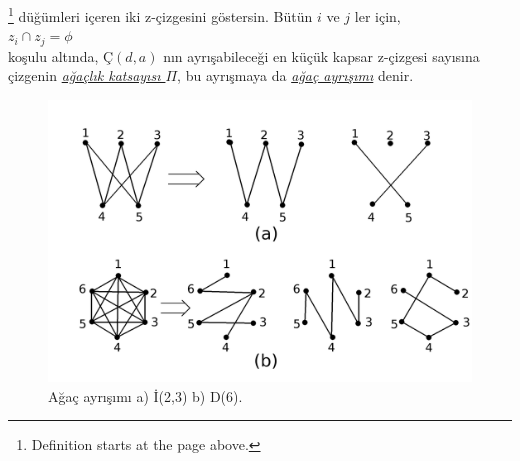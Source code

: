 \documentclass[11pt]{amsbook}
\begin{document}

	\begin{definition}\footnote{Definition starts at the page above.}
	    düğümleri içeren iki z-çizgesini göstersin. Bütün $i$ ve $j$ ler için,\\
	    $z_i \cap z_j = \phi$\\
	    koşulu altında, $Ç(d,a)$ nın ayrışabileceği en küçük kapsar z-çizgesi sayısına çizgenin \underline{\textit{ağaçlık katsayısı $\Pi$}}, bu ayrışmaya da \underline{\textit{ağaç ayrışımı}} denir.
	\end{definition}
	
	\begin{figure}[htb]
		\centering
		\includegraphics[width=1\textwidth]{images/ceyhun-221-fig01}
		\caption{Ağaç ayrışımı a) İ(2,3) b) D(6). }
	\end{figure}	
\end{document}
